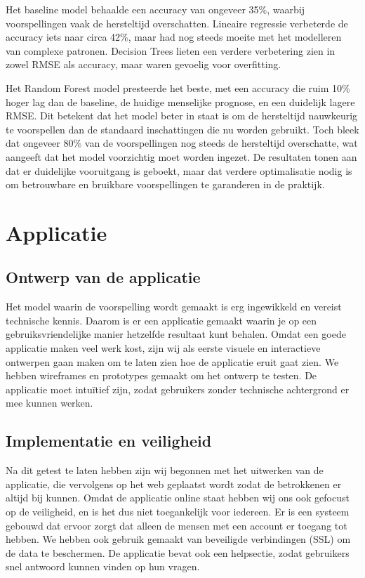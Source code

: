 \documentclass{article}
\begin{document}
Het baseline model behaalde een accuracy van ongeveer 35\%, waarbij voorspellingen vaak de hersteltijd overschatten. Lineaire regressie verbeterde de accuracy iets naar circa 42\%, maar had nog steeds moeite met het modelleren van complexe patronen. Decision Trees lieten een verdere verbetering zien in zowel RMSE als accuracy, maar waren gevoelig voor overfitting.

Het Random Forest model presteerde het beste, met een accuracy die ruim 10\% hoger lag dan de baseline, de huidige menselijke prognose, en een duidelijk lagere RMSE. Dit betekent dat het model beter in staat is om de hersteltijd nauwkeurig te voorspellen dan de standaard inschattingen die nu worden gebruikt. Toch bleek dat ongeveer 80\% van de voorspellingen nog steeds de hersteltijd overschatte, wat aangeeft dat het model voorzichtig moet worden ingezet. De resultaten tonen aan dat er duidelijke vooruitgang is geboekt, maar dat verdere optimalisatie nodig is om betrouwbare en bruikbare voorspellingen te garanderen in de praktijk.

\newpage
\section{Applicatie}

\subsection{Ontwerp van de applicatie}
Het model waarin de voorspelling wordt gemaakt is erg ingewikkeld en vereist technische kennis. Daarom is er een applicatie gemaakt waarin je op een gebruiksvriendelijke manier hetzelfde resultaat kunt behalen. Omdat een goede applicatie maken veel werk kost, zijn wij als eerste visuele en interactieve ontwerpen gaan maken om te laten zien hoe de applicatie eruit gaat zien. We hebben wireframes en prototypes gemaakt om het ontwerp te testen. De applicatie moet intuïtief zijn, zodat gebruikers zonder technische achtergrond er mee kunnen werken.

\subsection{Implementatie en veiligheid}
Na dit getest te laten hebben zijn wij begonnen met het uitwerken van de applicatie, die vervolgens op het web geplaatst wordt zodat de betrokkenen er altijd bij kunnen. Omdat de applicatie online staat hebben wij ons ook gefocust op de veiligheid, en is het dus niet toegankelijk voor iedereen. Er is een systeem gebouwd dat ervoor zorgt dat alleen de mensen met een account er toegang tot hebben. We hebben ook gebruik gemaakt van beveiligde verbindingen (SSL) om de data te beschermen. De applicatie bevat ook een helpsectie, zodat gebruikers snel antwoord kunnen vinden op hun vragen.
\end{document}
